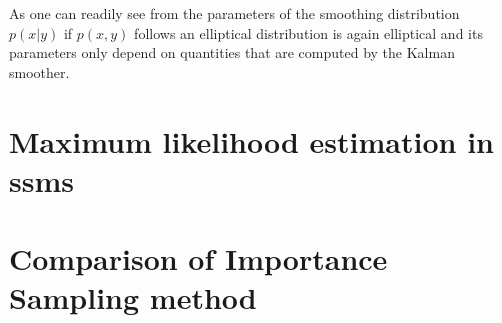 \begin{theorem}
    \label{thm:elliptical-conditional}
\end{theorem}

As one can readily see from  the parameters of the smoothing distribution $p(x|y)$ if $p(x,y)$ follows an elliptical distribution is again elliptical and its parameters only depend on quantities that are computed by the Kalman smoother. 



\section{Maximum likelihood estimation in \texorpdfstring{\glspl{ssm}}{state space models}}
\label{sec:maximum_likelihood_estimation}

\section{Comparison of Importance Sampling method}
\label{sec:simulation_studies}

